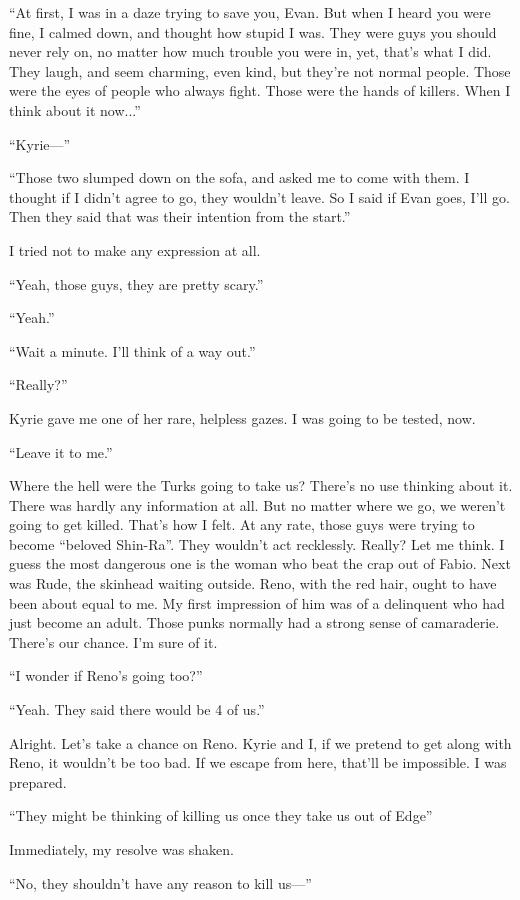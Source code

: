 \documentclass[oneside]{book}
\begin{document}
“At first, I was in a daze trying to save you, Evan. But when I heard you were fine, I calmed down, and thought how stupid I was. They were guys you should never rely on, no matter how much trouble you were in, yet, that’s what I did. They laugh, and seem charming, even kind, but they’re not normal people. Those were the eyes of people who always fight. Those were the hands of killers. When I think about it now...”

“Kyrie—”

“Those two slumped down on the sofa, and asked me to come with them. I thought if I didn’t agree to go, they wouldn’t leave. So I said if Evan goes, I’ll go. Then they said that was their intention from the start.”

I tried not to make any expression at all.

“Yeah, those guys, they are pretty scary.”

“Yeah.”

“Wait a minute. I’ll think of a way out.”

“Really?”

Kyrie gave me one of her rare, helpless gazes. I was going to be tested, now.

“Leave it to me.”

Where the hell were the Turks going to take us? There’s no use thinking about it. There was hardly any information at all. But no matter where we go, we weren’t going to get killed. That’s how I felt. At any rate, those guys were trying to become “beloved Shin-Ra”. They wouldn’t act recklessly. Really? Let me think. I guess the most dangerous one is the woman who beat the crap out of Fabio. Next was Rude, the skinhead waiting outside. Reno, with the red hair, ought to have been about equal to me. My first impression of him was of a delinquent who had just become an adult. Those punks normally had a strong sense of camaraderie. There’s our chance. I’m sure of it.

“I wonder if Reno’s going too?”

“Yeah. They said there would be 4 of us.”

Alright. Let’s take a chance on Reno. Kyrie and I, if we pretend to get along with Reno, it wouldn’t be too bad. If we escape from here, that’ll be impossible. I was prepared.

“They might be thinking of killing us once they take us out of Edge”

Immediately, my resolve was shaken.

“No, they shouldn’t have any reason to kill us—”
\end{document}
